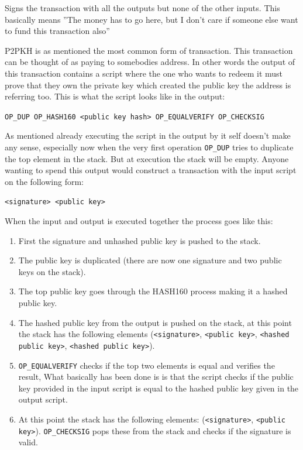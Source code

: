 Signs the transaction with all the outputs but none of the other inputs. This basically means ''The money has to go here, but I don't care if someone else want to fund this transaction also''


\label{p2pkh}
P2PKH is as mentioned the most common form of transaction. This transaction can be thought of as paying to somebodies address. In other words the output of this transaction contains a script where the one who wants to redeem it must prove that they own the private key which created the public key the address is referring too. This is what the script looks like in the output:

\texttt{OP\_DUP OP\_HASH160 <public key hash> OP\_EQUALVERIFY OP\_CHECKSIG}

As mentioned already executing the script in the output by it self doesn't make any sense, especially now when the very first operation \texttt{OP\_DUP} tries to duplicate the top element in the stack. But at execution the stack will be empty. Anyone wanting to spend this output would construct a transaction with the input script on the following form:

\texttt{<signature> <public key>}

When the input and output is executed together the process goes like this: 
\begin{enumerate}
	\item First the signature and unhashed public key is pushed to the stack.
	\item The public key is duplicated (there are now one signature and two public keys on the stack).
	\item The top public key goes through the HASH160 process making it a hashed public key.
	\item The hashed public key from the output is pushed on the stack, at this point the stack has the following elements (\texttt{<signature>}, \texttt{<public key>}, \texttt{<hashed public key>}, \texttt{<hashed public key>}).
	\item \texttt{OP\_EQUALVERIFY} checks if the top two elements is equal and verifies the result, What basically has been done is is that the script checks if the public key provided in the input script is equal to the hashed public key given in the output script.
	\item At this point the stack has the following elements: (\texttt{<signature>}, \texttt{<public key>}). \texttt{OP\_CHECKSIG} pops these from the stack and checks if the signature is valid.
\end{enumerate}

